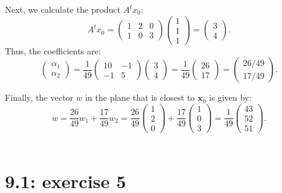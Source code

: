 \documentclass{report}
\begin{document}
Next, we calculate the product \( A^t x_0 \):
\[
A^t x_0 = \begin{pmatrix} 1 & 2 & 0 \\ 1 & 0 & 3 \end{pmatrix} \begin{pmatrix} 1 \\ 1 \\ 1 \end{pmatrix} = \begin{pmatrix} 3 \\ 4 \end{pmatrix}.
\]
Thus, the coefficients are:
\[
\begin{pmatrix} \alpha_1 \\ \alpha_2 \end{pmatrix} = \frac{1}{49} \begin{pmatrix} 10 & -1 \\ -1 & 5 \end{pmatrix} \begin{pmatrix} 3 \\ 4 \end{pmatrix} = \frac{1}{49} \begin{pmatrix} 26 \\ 17 \end{pmatrix} = \begin{pmatrix} 26/49 \\ 17/49 \end{pmatrix}.
\]

Finally, the vector \( w \) in the plane that is closest to \( \mathbf{x}_0 \) is given by:
\[
w = \frac{26}{49} w_1 + \frac{17}{49} w_2 = \frac{26}{49} \begin{pmatrix} 1 \\ 2 \\ 0 \end{pmatrix} + \frac{17}{49} \begin{pmatrix} 1 \\ 0 \\ 3 \end{pmatrix} = \frac{1}{49} \begin{pmatrix} 43 \\ 52 \\ 51 \end{pmatrix}.
\]\\


\section*{9.1: exercise 5} 
\end{document}
